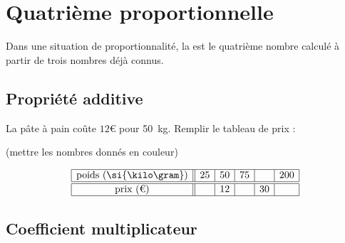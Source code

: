  

\section{Quatrième proportionnelle}

\begin{definition}
    Dans une situation de proportionnalité, la  est le quatrième nombre calculé à partir de trois nombres déjà connus.
\end{definition}

\subsection{Propriété additive}

La pâte à pain coûte \( 12\)€ pour \SI{50}{\kilo\gram}. Remplir le tableau de prix :

(mettre les nombres donnés en couleur)

\begin{equation*}
    \begin{array}[]{|c||c|c|c|c|c|}
        \hline
        \text{poids (\si{\kilo\gram})}&25&50&75&&200\\
        \hline\hline
        \text{prix (€)}&&12&&30&\\
        \hline
    \end{array}
\end{equation*}

\subsection{Coefficient multiplicateur}

